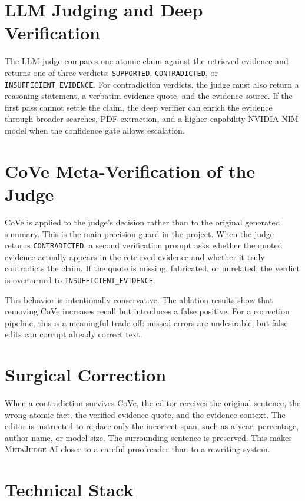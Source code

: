 \documentclass[12pt, a4paper]{report}
\newcommand{\sys}{\textsc{MetaJudge-AI}}
\begin{document}
\section{LLM Judging and Deep Verification}

The LLM judge compares one atomic claim against the retrieved evidence and
returns one of three verdicts:
\texttt{SUPPORTED}, \texttt{CONTRADICTED}, or
\texttt{INSUFFICIENT\_EVIDENCE}. For contradiction verdicts, the judge must also
return a reasoning statement, a verbatim evidence quote, and the evidence
source. If the first pass cannot settle the claim, the deep verifier can enrich
the evidence through broader searches, PDF extraction, and a higher-capability
NVIDIA NIM model when the confidence gate allows escalation.

\section{CoVe Meta-Verification of the Judge}

CoVe is applied to the judge's decision rather than to the original generated
summary. This is the main precision guard in the project. When the judge returns
\texttt{CONTRADICTED}, a second verification prompt asks whether the quoted
evidence actually appears in the retrieved evidence and whether it truly
contradicts the claim. If the quote is missing, fabricated, or unrelated, the
verdict is overturned to \texttt{INSUFFICIENT\_EVIDENCE}.

This behavior is intentionally conservative. The ablation results show that
removing CoVe increases recall but introduces a false positive. For a correction
pipeline, this is a meaningful trade-off: missed errors are undesirable, but
false edits can corrupt already correct text.

\section{Surgical Correction}

When a contradiction survives CoVe, the editor receives the original sentence,
the wrong atomic fact, the verified evidence quote, and the evidence context.
The editor is instructed to replace only the incorrect span, such as a year,
percentage, author name, or model size. The surrounding sentence is preserved.
This makes \sys{} closer to a careful proofreader than to a rewriting system.

\section{Technical Stack}
\end{document}
